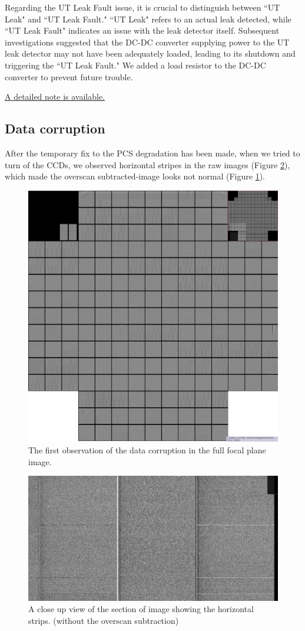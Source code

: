 Regarding the UT Leak Fault issue, it is crucial to distinguish between ``UT Leak" and ``UT Leak Fault." ``UT Leak" refers to an actual leak detected, while ``UT Leak Fault" indicates an issue with the leak detector itself. Subsequent investigations suggested that the DC-DC converter supplying power to the UT leak detector may not have been adequately loaded, leading to its shutdown and triggering the ``UT Leak Fault." We added a load resistor to the DC-DC converter to prevent future trouble.

\href{https://rubinobs.atlassian.net/wiki/spaces/CAM/pages/228065378/R24+Reb0+and+UT+leak+detector+fault}{A detailed note is available.}



\clearpage
\subsection{Data corruption}\label{sec:datacorruption}
After the temporary fix to the PCS degradation has been made, when we tried to turn of the CCDs, we observed horizontal stripes in the raw images (Figure \ref{fig:horizontal-stripes}), which made the overscan subtracted-image looks not normal (Figure \ref{fig:thefirstobservationofdatacorruption}).
\begin{figure}
    \centering
    \includegraphics[width=0.5\linewidth]{figures/Issues/FirstObservationofCorruption.png}
    \caption{The first observation of the data corruption in the full focal plane image.}
    \label{fig:thefirstobservationofdatacorruption}
\end{figure}
\begin{figure}
    \centering
    \includegraphics[width=0.5\linewidth]{figures/Issues/horizontalstripes.png}
    \caption{A close up view of the section of image showing the horizontal strips. (without the overscan subtraction)}
    \label{fig:horizontal-stripes}
\end{figure}

